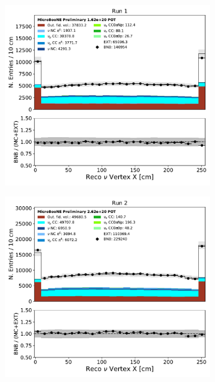 \begin{figure}[hbt!] 
\begin{center}
    \begin{subfigure}[b]{0.3\textwidth}
    \centering
    \includegraphics[width=1.00\textwidth]{NuMuCCsel/Images/Ryan/Run1/reco_nu_vtx_sce_x_08062020_samples_longest_noCRT_event_category.pdf}
    \caption{\label{fig:systematics:run1:nuvtxx}}
    \end{subfigure}
    \begin{subfigure}[b]{0.3\textwidth}
    \centering
    \includegraphics[width=1.00\textwidth]{NuMuCCsel/Images/Ryan/Run2/reco_nu_vtx_sce_x_08062020_samples_longest_noCRT_event_category.pdf}

\end{subfigure}
\end{center}
\end{figure}

